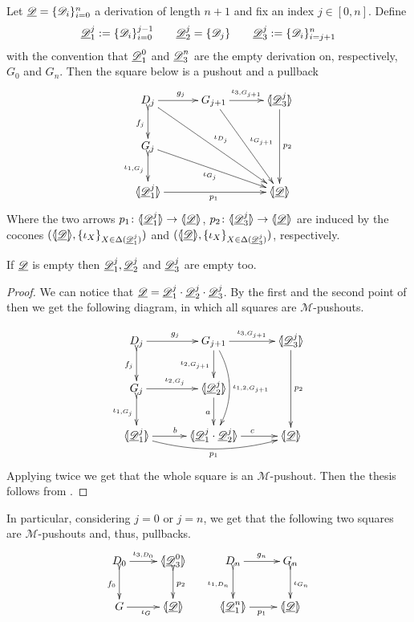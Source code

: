 \begin{corollary}\label{cor:colim}
Let $\underline{\mathscr{D}}=\{\mathscr{D}_i\}_{i=0}^n$ a derivation of length $n+1$ and fix an index $j\in[0,n]$. Define
\[\underline{\mathscr{D}}^j_1:=\{\mathscr{D}_i\}_{i=0}^{j-1} \qquad  \underline{\mathscr{D}}^j_2=\{\mathscr{D}_j\} \qquad \underline{\mathscr{D}}^j_3:=\{\mathscr{D}_i\}_{i=j+1}^n\]
with the convention that $\underline{\mathscr{D}}^0_1$ and $\underline{\mathscr{D}}^n_3$ are the empty derivation on, respectively, $G_0$ and $G_n$. Then the square below is a pushout and a pullback
\[\xymatrix@C=30pt{D_{j} \ar[ddrr]^{\iota_{D_j}} \ar[r]^{g_j}\ar@{>->}[d]_{f_j}& G_{j+1} \ar[ddr]^{\iota_{G_{j+1}}} \ar[r]^-{\iota_{3, G_{j+1}}} & \lpro \der{D}^j_3\rpro \ar[dd]^{p_2} \\ G_j\ar[drr]_{\iota_{G_{j}}} \ar@{>->}[d]_{\iota_{1,G_j}}\\ \lpro \der{D}^j_1 \rpro \ar[rr]_{p_1}  &&\tpro{D} }\] 
Where the two arrows $p_1\colon \langle \hspace{-1.85pt}[\underline{\mathscr{D}}^j_1 ]\hspace{-1.85pt}\rangle\to \langle \hspace{-1.85pt}[ \underline{\mathscr{D}}]\hspace{-1.85pt}\rangle$, $p_2\colon \langle \hspace{-1.85pt}[ \underline{\mathscr{D}}^j_3]\hspace{-1.85pt}\rangle \to \langle \hspace{-1.85pt}[ \underline{\mathscr{D}}]\hspace{-1.85pt}\rangle$ are induced by the cocones $(\langle \hspace{-1.85pt}[ \underline{\mathscr{D}}]\hspace{-1.85pt}\rangle, \{\iota_{X}\}_{X\in \Delta(\underline{\mathscr{D}}^j_1)})$ and $(\langle \hspace{-1.85pt}[ \underline{\mathscr{D}}]\hspace{-1.85pt}\rangle, \{\iota_{X}\}_{X\in \Delta(\underline{\mathscr{D}}^j_3)})$, respectively.
\end{corollary}
\begin{remark}
If $\underline{\mathscr{D}}$ is empty then $\underline{\mathscr{D}}^j_1, \underline{\mathscr{D}}^j_2$ and $\underline{\mathscr{D}}^j_3$ are empty too.
\end{remark}
\begin{proof}
We can notice that $\underline{\mathscr{D}}=\underline{\mathscr{D}}^j_1\cdot \underline{\mathscr{D}}^j_2 \cdot \underline{\mathscr{D}}^j_3$. By the first and the second point of  then we get the following diagram, in which all squares are $\mathcal{M}$-pushouts.

\[\xymatrix@C=30pt{D_{j}  \ar[r]^{g_j}\ar@{>->}[d]_{f_j}& G_{j+1}  \ar[r]^-{\iota_{3,G_{j+1}}} \ar[d]_{\iota_{2, G_{j+1}}}  \ar@/^.5cm/[dd]^{\iota_{1,2, G_{j+1}}}& \lpro \der{D}^j_3\rpro \ar[dd]^{p_2} \\ G_j \ar[r]^{\iota_{2, G_j}}\ar@{>->}[d]_{\iota_{1,G_j}} & \lpro \der{D}^j_2\rpro \ar[d]_a\\ \lpro \der{D}^j_1 \rpro \ar@/_.4cm/[rr]_{p_1} \ar[r]^b &\lpro \der{D}^j_1\cdot \der{D}^j_2 \rpro \ar[r]^c&\tpro{D} }\] 
Applying  twice we get that the whole square is an $\mathcal{M}$-pushout. Then the thesis follows from .
\end{proof}

\begin{remark}\label{rem:zero1} In particular, considering $j=0$ or $j=n$, we get that the following two squares are $\mathcal{M}$-pushouts and, thus, pullbacks.
	\[\xymatrix{D_0 \ar[r]^-{\iota_{3, D_0}} \ar@{>->}[d]_{f_0}& \lpro \der{D}^0_3 \rpro \ar@{>->}[d]^{p_2} &D_n \ar@{>->}[d]_{\iota_{1, D_n}}\ar[r]^{g_n}& G_n \ar@{>->}[d]^{\iota_{G_n}}\\ G \ar[r]_{\iota_G}& \tpro{D} & \lpro \der{D}^n_1 \rpro \ar[r]_{p_1}  & \tpro{D}}\]
\end{remark}

